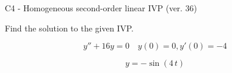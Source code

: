 \begin{exercise}
  \begin{exerciseTitle}C4 - Homogeneous second-order linear IVP (ver. 36)\end{exerciseTitle}
  \begin{exerciseStatement}
    
Find the solution to the given IVP.

    
\[y''+16y = 0 \hspace{1em} y(0) = 0 , y'(0) = -4\]

  \end{exerciseStatement}
  \begin{exerciseAnswer}
    
\[y= -\sin\left(4 \, t\right)\]

  \end{exerciseAnswer}
\end{exercise}